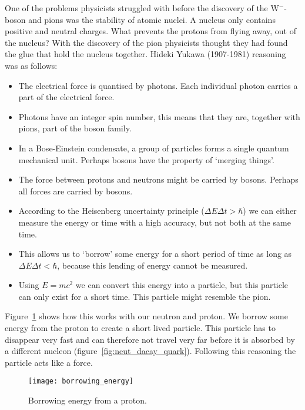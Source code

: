 One of the problems physicists struggled with before the discovery of the W$^-$-boson and pions was the stability of atomic nuclei. A nucleus only contains positive and neutral charges. What prevents the protons from flying away, out of the nucleus? With the discovery of the pion physicists thought they had found the glue that hold the nucleus together. Hideki Yukawa (1907-1981) reasoning was as follows:
\begin{itemize}
\item The electrical force is quantised by photons. Each individual photon carries a part of the electrical force.
\item Photons have an integer spin number, this means that they are, together with pions, part of the boson family.
\item In a Bose-Einstein condensate, a group of particles forms a single quantum mechanical unit. Perhaps bosons have the property of `merging things'.
\item The force between protons and neutrons might be carried by bosons. Perhaps all forces are carried by bosons.
\item According to the Heisenberg uncertainty principle ($\Delta E \Delta t > \hbar$) we can either measure the energy or time with a high accuracy, but not both at the same time.
\item This allows us to `borrow' some energy for a short period of time as long as $\Delta E \Delta t < \hbar$, because this lending of energy cannot be measured.
\item Using $E=mc^2$ we can convert this energy into a particle, but this particle can only exist for a short time. This particle might resemble the pion.
\end{itemize}

Figure~\ref{fig:borrowing_energy} shows how this works with our neutron and proton. We borrow some energy from the proton to create a short lived particle. This particle has to disappear very fast and can therefore not travel very far before it is absorbed by a different nucleon (figure~\ref{fig:neut_dacay_quark}). Following this reasoning the particle acts like a force.

\begin{figure}\begin{center}
\texttt{[image: borrowing\_energy]}%
\caption{Borrowing energy from a proton.}\label{fig:borrowing_energy}
\end{center}\end{figure}

